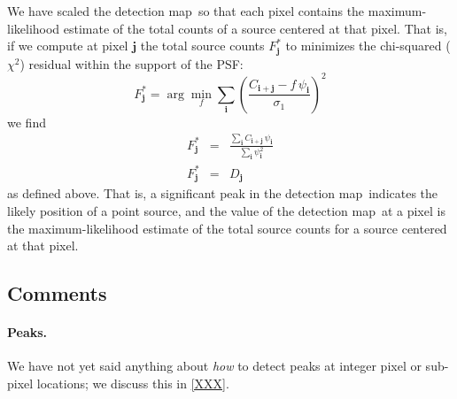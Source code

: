 \documentclass[letterpaper,preprint]{aastex62}
\newcommand{\doctype}{paper}
\newcommand{\detmap}{detection map}
\newcommand{\psf}{\psi}
\newcommand{\psfat}[1]{\psf_{#1}}
\renewcommand{\vec}[1]{\boldsymbol{#1}}
\newcommand{\ivec}{\vec{i}}
\newcommand{\jvec}{\vec{j}}
\begin{document}
We have scaled the \detmap\ so that each pixel contains the
maximum-likelihood estimate of the total counts of a source centered
at that pixel.  That is, if we compute at pixel $\jvec$ the total
source counts $F^{\ast}_{\jvec}$ to minimizes the chi-squared
($\chi^2$) residual within the support of the PSF:
\begin{equation}
  F^{\ast}_{\jvec} = \arg\min_{f} \sum_{\ivec} \left( \frac{C_{\ivec+\jvec} - f \, \psfat{\ivec}}{\sigma_1} \right)^2
\end{equation}
we find
\begin{eqnarray}
  F^{\ast}_{\jvec} &=& \frac{\sum_{\ivec} C_{\ivec+\jvec} \, \psfat{\ivec}}{\sum_{\ivec} \psfat{\ivec}^2}
  \\
  F^{\ast}_{\jvec} &=& D_{\jvec} %
\end{eqnarray}
as defined above.
%
That is, a significant peak in the \detmap\ indicates the likely
position of a point source, and the value of the \detmap\ at a pixel
is the maximum-likelihood estimate of the total source counts for a
source centered at that pixel.


\subsection{Comments}





\paragraph{Peaks.}  We have not yet said anything about \emph{how} to
detect peaks at integer pixel or sub-pixel locations; we discuss this
in \ref{XXX}.
\end{document}
